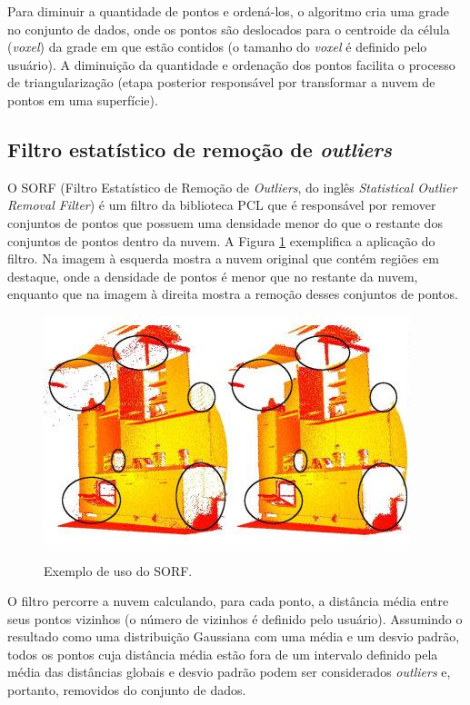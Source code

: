 Para diminuir a quantidade de pontos e ordená-los, o algoritmo cria uma grade no conjunto de dados, onde os pontos são deslocados para o centroide da célula (\textit{voxel}) da grade em que estão contidos (o tamanho do \textit{voxel} é definido pelo usuário). A diminuição da quantidade e ordenação dos pontos facilita o processo de triangularização (etapa posterior responsável por transformar a nuvem de pontos em uma superfície).

\subsection{Filtro estatístico de remoção de \textit{outliers}}
\label{sec:statistical_outlier_removal}

O SORF (Filtro Estatístico de Remoção de \textit{Outliers}, do inglês \textit{Statistical Outlier Removal Filter}) é um filtro da biblioteca PCL que é responsável por remover conjuntos de pontos que possuem uma densidade menor do que o restante dos conjuntos de pontos dentro da nuvem. 
A Figura \ref{fig:outlier_filter} exemplifica a aplicação do filtro. Na imagem à esquerda mostra a nuvem original que contém regiões em destaque, onde a densidade de pontos é menor que no restante da nuvem, enquanto que na imagem à direita mostra a remoção desses conjuntos de pontos.

\begin{figure}[H]
    \centering
    \caption{Exemplo de uso do SORF.}
    \includegraphics[scale=0.6]{dados/figuras/outlier_filter.jpg}
    \label{fig:outlier_filter}
\end{figure}

O filtro percorre a nuvem calculando, para cada ponto, a distância média entre seus pontos vizinhos (o número de vizinhos é definido pelo usuário). Assumindo o resultado como uma distribuição Gaussiana com uma média e um desvio padrão, todos os pontos cuja distância média estão fora de um intervalo definido pela média das distâncias globais e desvio padrão podem ser considerados \textit{outliers} e, portanto, removidos do conjunto de dados.

